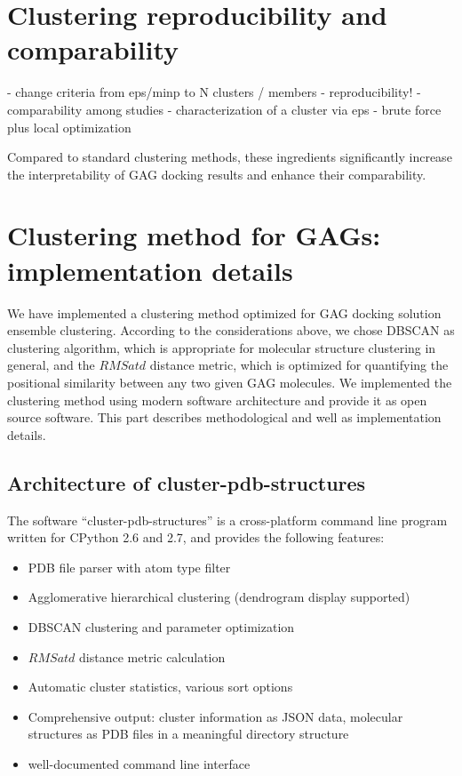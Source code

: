 \section{Clustering reproducibility and comparability}

- change criteria from eps/minp to N clusters / members
- reproducibility!
- comparability among studies
- characterization of a cluster via eps
- brute force plus local optimization

Compared to standard clustering methods, these ingredients significantly
increase the interpretability of GAG docking results and enhance their
comparability.


\section{Clustering method for GAGs: implementation details}

We have implemented a clustering method optimized for GAG docking solution
ensemble clustering. According to the considerations above, we chose DBSCAN as
clustering algorithm, which is appropriate for molecular structure clustering in
general, and the $RMSatd$ distance metric, which is optimized for quantifying
the positional similarity between any two given GAG molecules. We implemented
the clustering method using modern software architecture and provide it as open
source software. This part describes methodological and well as implementation
details.

\subsection{Architecture of cluster-pdb-structures}

The software \enquote{cluster-pdb-structures} is a cross-platform command line
program written for CPython 2.6 and 2.7, and provides the following features:

\begin{itemize}
\item PDB file parser with atom type filter
\item Agglomerative hierarchical clustering (dendrogram display supported)
\item DBSCAN clustering and parameter optimization
\item $RMSatd$ distance metric calculation
\item Automatic cluster statistics, various sort options
\item Comprehensive output: cluster information as JSON data, molecular
structures as PDB files in a meaningful directory structure
\item well-documented command line interface
\end{itemize}

